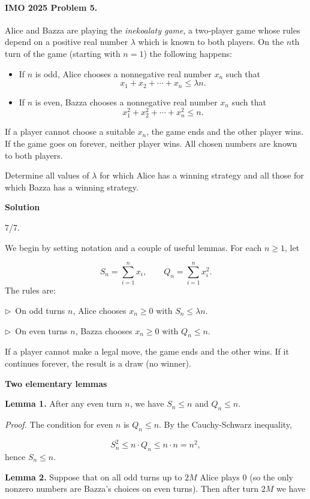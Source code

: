 \documentclass{llmxive}
\providecommand{\ii}{\item}
\providecommand{\solutionheading}[1]{\par\smallskip\noindent\textbf{#1}\par}
\providecommand{\compactbullet}[1]{\par\noindent$\triangleright$~#1\par}
\begin{document}
\paragraph{IMO 2025 Problem 5.}
\begin{mdframed}[style=mdpurplebox,frametitle={IMO 2025 Problem 5}]
Alice and Bazza are playing the \emph{inekoalaty game},
a two‑player game whose rules depend on a positive real number $\lambda$ which is known to both players.
On the $n$th turn of the game (starting with $n=1$) the following happens:
\begin{itemize}
  \ii If $n$ is odd, Alice chooses a nonnegative real number $x_n$ such that
  \[ x_1 + x_2 + \cdots + x_n \le \lambda n.  \]
  \ii If $n$ is even, Bazza chooses a nonnegative real number $x_n$ such that
  \[ x_1^2 + x_2^2 + \cdots + x_n^2 \le n.  \]
\end{itemize}
If a player cannot choose a suitable $x_n$, the game ends and the other player wins.
If the game goes on forever, neither player wins.
All chosen numbers are known to both players.

Determine all values of $\lambda$ for which Alice has a winning strategy
and all those for which Bazza has a winning strategy.
\end{mdframed}
\solutionheading{Solution}
\begin{remark*}
  7/7.
\end{remark*}
We begin by setting notation and a couple of useful lemmas. For each \(n\ge 1\), let\par
\[
S_n = \sum_{i=1}^n x_i, \qquad Q_n = \sum_{i=1}^n x_i^2.
\]
The rules are:\par
\compactbullet{On odd turns \(n\), Alice chooses \(x_n\ge 0\) with \(S_n\le \lambda n\).}
\compactbullet{On even turns \(n\), Bazza chooses \(x_n\ge 0\) with \(Q_n\le n\).}
If a player cannot make a legal move, the game ends and the other wins. If it continues forever, the result is a draw (no winner).\par
\smallskip
\solutionheading{Two elementary lemmas}
\textbf{Lemma 1.} After any even turn \(n\), we have \(S_n\le n\) and \(Q_n\le n\).\par
\emph{Proof.} The condition for even \(n\) is \(Q_n\le n\). By the Cauchy-Schwarz inequality,\par
\[
S_n^2 \le n\cdot Q_n \le n\cdot n = n^2,
\]
hence \(S_n\le n\).\par
\textbf{Lemma 2.} Suppose that on all odd turns up to \(2M\) Alice plays \(0\) (so the only nonzero numbers are Bazza's choices on even turns). Then after turn \(2M\) we have\par
\end{document}
